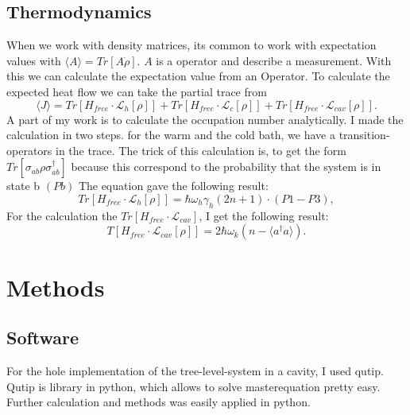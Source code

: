 \documentclass[12pt,a4paper]{article}
\begin{document}
\subsection{Thermodynamics}
 When we work with density matrices, its common to work with expectation values with $\langle A \rangle=Tr[A\dot{\rho}]$.
 $A$ is a operator and describe a measurement.
With this we can calculate the expectation value from an Operator. 
To calculate the expected heat flow we can take the partial trace from 
\begin{equation}
\langle J\rangle=Tr[H_{free}\cdot \mathcal{L}_h[\rho]]+Tr[H_{free}\cdot \mathcal{L}_c[\rho]]+Tr[H_{free}\cdot \mathcal{L}_{cav}[\rho]].
\end{equation}
A part of my work is to calculate the occupation number analytically. 
I made the calculation in two steps. for the warm and the cold bath, we have a transition-operators in the trace.
The trick of this calculation is, to get the form $Tr[\sigma_{ab}\rho \sigma_{ab}^{\dag{}}]$ because this correspond to the probability that the system is in state b $(Pb)$
The equation gave the following result:
\begin{equation}
Tr[H_{free}\cdot \mathcal{L}_h[\rho]]=\hbar \omega_h \gamma_h (2n+1) \cdot( P1-P3) ,
\end{equation}
For the calculation the $Tr[H_{free}\cdot \mathcal{L}_{cav}]$, I get the following result:
\begin{equation}
T[H_{free}\cdot \mathcal{L}_{cav}[\rho]]=2\hbar \omega_k (n-\langle a^{\dag{}}a \rangle).
\end{equation}



\section{Methods}
\subsection{Software}
For the hole implementation of the tree-level-system in a cavity, I used qutip. Qutip is library in python, which allows to solve masterequation pretty easy.
Further calculation and methods was easily applied in python. 
\end{document}
